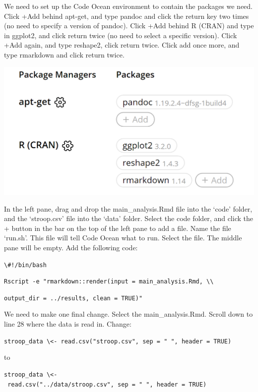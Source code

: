 \documentclass[
  oneside]{book}
\begin{document}
We need to set up the Code Ocean environment to contain the packages we need.
Click +Add behind apt-get, and type pandoc and click the return key two times
(no need to specify a version of pandoc). Click +Add behind R (CRAN) and type in
ggplot2, and click return twice (no need to select a specific version). Click
+Add again, and type reshape2, click return twice. Click add once more, and type
rmarkdown and click return twice.

\begin{center}\includegraphics[width=1\linewidth]{images/7be787e67b7e874fa88cfc2daae850b4} \end{center}

In the left pane, drag and drop the main\_analysis.Rmd file into the `code' folder, and the `stroop.csv' file into the `data' folder. Select the code folder, and click the + button in the bar on the top of the left pane to add a
file. Name the file `run.sh'. This file will tell Code Ocean what to run. Select the file. The middle pane will be empty. Add the following code:

\texttt{\textbackslash{}\#!/bin/bash}

\texttt{Rscript\ -e\ "rmarkdown::render(input\ =\ \textquotesingle{}main\_analysis.Rmd\textquotesingle{},\ \textbackslash{}\textbackslash{}}

\texttt{output\_dir\ =\ \textquotesingle{}../results\textquotesingle{},\ clean\ =\ TRUE)"}

We need to make one final change. Select the main\_analysis.Rmd. Scroll down to
line 28 where the data is read in. Change:

\texttt{stroop\_data\ \textbackslash{}\textless{}-\ read.csv("stroop.csv",\ sep\ =\ "\ ",\ header\ =\ TRUE)}

to

\texttt{stroop\_data\ \textbackslash{}\textless{}-\ read.csv("../data/stroop.csv",\ sep\ =\ "\ ",\ header\ =\ TRUE)}
\end{document}
